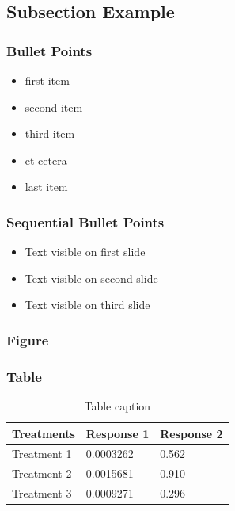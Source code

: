 \documentclass[12pt]{beamer}\usepackage[]{graphicx}\usepackage[]{color}
\begin{document}
\subsection{Subsection Example} %

\begin{frame}
\frametitle{Bullet Points}
\begin{itemize}
\item first item
\item second item
\item third item
\item et cetera
\item last item
\end{itemize}
\end{frame}

\begin{frame}
\frametitle{Sequential Bullet Points}
\begin{itemize}
\item<1-> Text visible on first slide
\item<2-> Text visible on second slide
\item<3-> Text visible on third slide
\end{itemize}
\end{frame}

\begin{frame}
\frametitle{Figure}
\end{frame}

\begin{frame}
\frametitle{Table}
\begin{table}
\begin{tabular}{l l l}
\toprule
\textbf{Treatments} & \textbf{Response 1} & \textbf{Response 2}\\
\midrule
Treatment 1 & 0.0003262 & 0.562 \\
Treatment 2 & 0.0015681 & 0.910 \\
Treatment 3 & 0.0009271 & 0.296 \\
\bottomrule
\end{tabular}
\caption{Table caption}
\end{table}
\end{frame}
\end{document}
